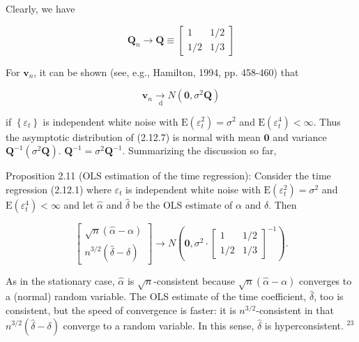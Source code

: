 \documentclass[10pt]{article}
\begin{document}
Clearly, we have

\[
\mathbf{Q}_{n} \rightarrow \mathbf{Q} \equiv\left[\begin{array}{cc}
1 & 1 / 2  \tag{2.12.10}\\
1 / 2 & 1 / 3
\end{array}\right]
\]

For $\mathbf{v}_{n}$, it can be shown (see, e.g., Hamilton, 1994, pp. 458-460) that


\begin{equation*}
\mathbf{v}_{n} \underset{\mathrm{~d}}{\rightarrow} N\left(\mathbf{0}, \sigma^{2} \mathbf{Q}\right) \tag{2.12.11}
\end{equation*}


if $\left\{\varepsilon_{t}\right\}$ is independent white noise with $\mathrm{E}\left(\varepsilon_{t}^{2}\right)=\sigma^{2}$ and $\mathrm{E}\left(\varepsilon_{t}^{4}\right)<\infty$. Thus the asymptotic distribution of (2.12.7) is normal with mean $\mathbf{0}$ and variance $\mathbf{Q}^{-1}\left(\sigma^{2} \mathbf{Q}\right)$. $\mathbf{Q}^{-1}=\sigma^{2} \mathbf{Q}^{-1}$. Summarizing the discussion so far,

Proposition 2.11 (OLS estimation of the time regression): Consider the time regression (2.12.1) where $\varepsilon_{t}$ is independent white noise with $\mathrm{E}\left(\varepsilon_{t}^{2}\right)=\sigma^{2}$ and\\
$\mathrm{E}\left(\varepsilon_{t}^{4}\right)<\infty$ and let $\hat{\alpha}$ and $\hat{\delta}$ be the OLS estimate of $\alpha$ and $\delta$. Then

$$
\left[\begin{array}{c}
\sqrt{n}(\hat{\alpha}-\alpha) \\
n^{3 / 2}(\hat{\delta}-\delta)
\end{array}\right] \rightarrow N\left(\mathbf{0}, \sigma^{2} \cdot\left[\begin{array}{cc}
1 & 1 / 2 \\
1 / 2 & 1 / 3
\end{array}\right]^{-1}\right) .
$$

As in the stationary case, $\hat{\alpha}$ is $\sqrt{n}$-consistent because $\sqrt{n}(\hat{\alpha}-\alpha)$ converges to a (normal) random variable. The OLS estimate of the time coefficient, $\hat{\delta}$, too is consistent, but the speed of convergence is faster: it is $n^{3 / 2}$-consistent in that $n^{3 / 2}(\hat{\delta}-\delta)$ converge to a random variable. In this sense, $\hat{\delta}$ is hyperconsistent. ${ }^{23}$
\end{document}
